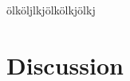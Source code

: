 \documentclass[a4paper,12pt,bibliography=totoc,numbers=noenddot,sfdefaults=false,abstract=true,notitlepage]{scrartcl} %
\begin{document}
	ölköljlkjölkölkjölkj
	
	
	
	
	
	
	
	
	\section{Discussion}\label{discussion}
	
	
	
	
	
	
	
	
	\FloatBarrier
	\printbibliography
	
	
	
	

	
	
	\clearpage
	\setcounter{secnumdepth}{3} %
	\appendix %
	
\end{document}
